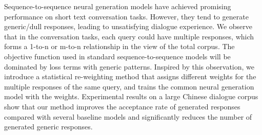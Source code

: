 Sequence-to-sequence neural generation models have achieved promising performance on short text conversation tasks. However, they tend to generate generic/dull responses, leading to unsatisfying dialogue experience.  We observe that in the conversation tasks, each query could have multiple responses, which forms a 1-to-n or m-to-n relationship in the view of the total corpus. The objective function used in standard sequence-to-sequence models will be dominated by loss terms with generic patterns. Inspired by this observation, we introduce a statistical re-weighting method that assigns different weights for the multiple responses of the same query, and trains the common neural generation model with the weights. Experimental results on a large Chinese dialogue corpus show that our method improves the acceptance rate of generated responses compared with several baseline models and significantly reduces the number of generated generic responses.
